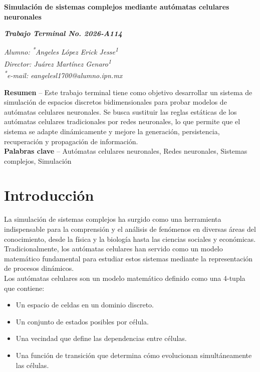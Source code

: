 \documentclass[letterpaper,10pt,oneside]{article}
\newcommand\authormark[1]{\textsuperscript{#1}}
\begin{document}
	\begin{center}
		\fontsize{14}{16}\selectfont\bfseries
		Simulación de sistemas complejos mediante autómatas celulares neuronales
	\end{center}
	
	\begin{center}
		\fontsize{14}{16}\selectfont\bfseries
		\textit{Trabajo Terminal No. 2026-A114}
	\end{center}
	
	\begin{center}
		\fontsize{12}{16}\selectfont
		\textit{Alumno: \authormark{*}Angeles López Erick Jesse\authormark{1}} \\
		\textit{Director: Juárez Martínez Genaro\authormark{1}} \\
		\textit{\authormark{*}e-mail: eangelesl1700@alumno.ipn.mx}
	\end{center}
	
	\textbf{Resumen} -- Este trabajo terminal tiene como objetivo desarrollar un sistema de simulación de espacios discretos bidimensionales para probar modelos de autómatas celulares neuronales. Se busca sustituir las reglas estáticas de los autómatas celulares tradicionales por redes neuronales, lo que permite que el sistema se adapte dinámicamente y mejore la generación, persistencia, recuperación y propagación de información. \\
	
	\textbf{Palabras clave} -- Autómatas celulares neuronales, Redes neuronales, Sistemas complejos, Simulación
	
	\section{Introducción}
	
	La simulación de sistemas complejos ha surgido como una herramienta indispensable para la comprensión y el análisis de fenómenos en diversas áreas del conocimiento, desde la física y la biología hasta las ciencias sociales y económicas. Tradicionalmente, los autómatas celulares han servido como un modelo matemático fundamental para estudiar estos sistemas mediante la representación de procesos dinámicos. \\
	
	Los autómatas celulares son un modelo matemático definido como una 4-tupla que contiene: 
	\begin{itemize}
		\item Un espacio de celdas en un dominio discreto.
		\item Un conjunto de estados posibles por célula.
		\item Una vecindad que define las dependencias entre células.
		\item Una función de transición que determina cómo evolucionan simultáneamente las células\cite{wolframCA, ZenilMartinez2024}. \\
	\end{itemize}
	
\end{document}
